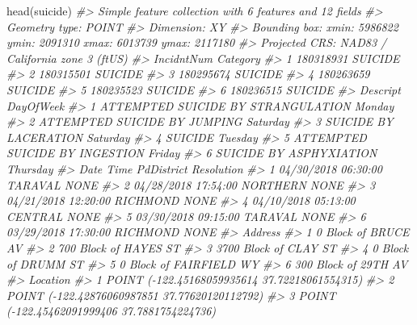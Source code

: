 \documentclass[
  12pt,
  openany]{book}
\newenvironment{Shaded}{\begin{snugshade}}{\end{snugshade}}
\newcommand{\CommentTok}[1]{\textcolor[rgb]{0.37,0.37,0.37}{\textit{#1}}}
\newcommand{\FunctionTok}[1]{\textcolor[rgb]{0,0,0}{#1}}
\newcommand{\NormalTok}[1]{#1}
\begin{document}
\begin{Shaded}
\begin{Highlighting}[]
\FunctionTok{head}\NormalTok{(suicide)}
\CommentTok{\#\textgreater{} Simple feature collection with 6 features and 12 fields}
\CommentTok{\#\textgreater{} Geometry type: POINT}
\CommentTok{\#\textgreater{} Dimension:     XY}
\CommentTok{\#\textgreater{} Bounding box:  xmin: 5986822 ymin: 2091310 xmax: 6013739 ymax: 2117180}
\CommentTok{\#\textgreater{} Projected CRS: NAD83 / California zone 3 (ftUS)}
\CommentTok{\#\textgreater{}   IncidntNum Category}
\CommentTok{\#\textgreater{} 1  180318931  SUICIDE}
\CommentTok{\#\textgreater{} 2  180315501  SUICIDE}
\CommentTok{\#\textgreater{} 3  180295674  SUICIDE}
\CommentTok{\#\textgreater{} 4  180263659  SUICIDE}
\CommentTok{\#\textgreater{} 5  180235523  SUICIDE}
\CommentTok{\#\textgreater{} 6  180236515  SUICIDE}
\CommentTok{\#\textgreater{}                             Descript DayOfWeek}
\CommentTok{\#\textgreater{} 1 ATTEMPTED SUICIDE BY STRANGULATION    Monday}
\CommentTok{\#\textgreater{} 2       ATTEMPTED SUICIDE BY JUMPING  Saturday}
\CommentTok{\#\textgreater{} 3              SUICIDE BY LACERATION  Saturday}
\CommentTok{\#\textgreater{} 4                            SUICIDE   Tuesday}
\CommentTok{\#\textgreater{} 5     ATTEMPTED SUICIDE BY INGESTION    Friday}
\CommentTok{\#\textgreater{} 6            SUICIDE BY ASPHYXIATION  Thursday}
\CommentTok{\#\textgreater{}         Date     Time PdDistrict Resolution}
\CommentTok{\#\textgreater{} 1 04/30/2018 06:30:00    TARAVAL       NONE}
\CommentTok{\#\textgreater{} 2 04/28/2018 17:54:00   NORTHERN       NONE}
\CommentTok{\#\textgreater{} 3 04/21/2018 12:20:00   RICHMOND       NONE}
\CommentTok{\#\textgreater{} 4 04/10/2018 05:13:00    CENTRAL       NONE}
\CommentTok{\#\textgreater{} 5 03/30/2018 09:15:00    TARAVAL       NONE}
\CommentTok{\#\textgreater{} 6 03/29/2018 17:30:00   RICHMOND       NONE}
\CommentTok{\#\textgreater{}                   Address}
\CommentTok{\#\textgreater{} 1     0 Block of BRUCE AV}
\CommentTok{\#\textgreater{} 2   700 Block of HAYES ST}
\CommentTok{\#\textgreater{} 3   3700 Block of CLAY ST}
\CommentTok{\#\textgreater{} 4     0 Block of DRUMM ST}
\CommentTok{\#\textgreater{} 5 0 Block of FAIRFIELD WY}
\CommentTok{\#\textgreater{} 6    300 Block of 29TH AV}
\CommentTok{\#\textgreater{}                                         Location}
\CommentTok{\#\textgreater{} 1  POINT ({-}122.45168059935614 37.72218061554315)}
\CommentTok{\#\textgreater{} 2  POINT ({-}122.42876060987851 37.77620120112792)}
\CommentTok{\#\textgreater{} 3   POINT ({-}122.45462091999406 37.7881754224736)}

\end{Highlighting}
\end{Shaded}
\end{document}
